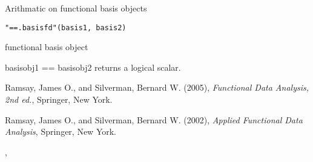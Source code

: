 \begin{Description}\relax
Arithmatic on functional basis objects
\end{Description}
\begin{Usage}
\begin{verbatim}
"==.basisfd"(basis1, basis2)
\end{verbatim}
\end{Usage}
\begin{Arguments}
\begin{ldescription}
\item[\code{basis1, basis2}] functional basis object 

\end{ldescription}
\end{Arguments}
\begin{Value}
basisobj1 == basisobj2 returns a logical scalar.
\end{Value}
\begin{References}\relax
Ramsay, James O., and Silverman, Bernard W. (2005), \emph{Functional 
Data Analysis, 2nd ed.}, Springer, New York. 

Ramsay, James O., and Silverman, Bernard W. (2002), \emph{Applied
Functional Data Analysis}, Springer, New York.
\end{References}
\begin{SeeAlso}\relax
{}, 
\end{SeeAlso}

